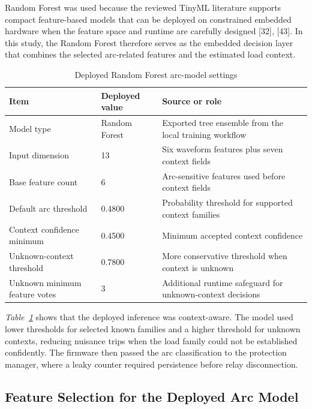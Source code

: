 Random Forest was used because the reviewed TinyML literature supports compact
feature-based models that can be deployed on constrained embedded hardware
when the feature space and runtime are carefully designed [32], [43]. In this
study, the Random Forest therefore serves as the embedded decision layer that
combines the selected arc-related features and the estimated load context.
\begin{table}[H]
  \centering
  \caption{Deployed Random Forest arc-model settings}
  \label{tab:ch3-arc-model-export}
  \begin{tabular}{p{}p{}p{}}
    \toprule
    \textbf{Item} & \textbf{Deployed value} & \textbf{Source or role} \\
    \midrule
    Model type & Random Forest & Exported tree ensemble from the local training workflow \\
    Input dimension & 13 & Six waveform features plus seven context fields \\
    Base feature count & 6 & Arc-sensitive features used before context fields \\
    Default arc threshold & 0.4800 & Probability threshold for supported context families \\
    Context confidence minimum & 0.4500 & Minimum accepted context confidence \\
    Unknown-context threshold & 0.7800 & More conservative threshold when context is unknown \\
    Unknown minimum feature votes & 3 & Additional runtime safeguard for unknown-context decisions \\
    \bottomrule
  \end{tabular}
\end{table}

\textit{Table~\ref{tab:ch3-arc-model-export}} shows that the deployed inference was
context-aware. The model used lower thresholds for selected known families and
a higher threshold for unknown contexts, reducing nuisance trips when the load
family could not be established confidently. The firmware then passed the arc
classification to the protection manager, where a leaky counter required
persistence before relay disconnection.

\subsection{Feature Selection for the Deployed Arc Model}
\label{sec:ch3-arc-feature-selection}

